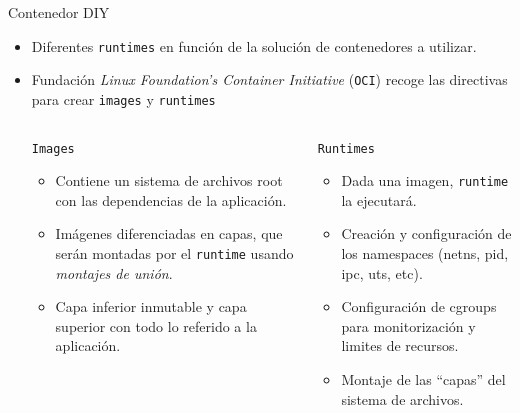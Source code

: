 \documentclass[aspectratio=169,xcolor=dvipsnames]{beamer}
\begin{document}
	\begin{frame}{Contenedor DIY}
	    \begin{itemize}
	        \item Diferentes \texttt{runtimes} en función de la solución de contenedores a utilizar.
	        \item Fundación \textit{Linux Foundation's Container Initiative} (\texttt{OCI}) recoge las directivas para crear \texttt{images} y \texttt{runtimes}
	        
	        \begin{columns}
	                \begin{column}{0.5\textwidth}
	                \begin{exampleblock}{\texttt{Images}}
	                    \begin{itemize}
	                        \item Contiene un sistema de archivos root con las dependencias de la aplicación.
	                        \item Imágenes diferenciadas en capas, que serán montadas por el \texttt{runtime} usando \textit{montajes de unión}.
	                        \item Capa inferior inmutable y capa superior con todo lo referido a la aplicación.
	                    \end{itemize}
	                \end{exampleblock}
	                \end{column}
	                
	                \begin{column}{0.5\textwidth}
	                \begin{exampleblock}{\texttt{Runtimes}}
	                    \begin{itemize}
	                        \item Dada una imagen, \texttt{runtime} la ejecutará.
	                        \item Creación y configuración de los namespaces (netns, pid, ipc, uts, etc).
	                        \item Configuración de cgroups para monitorización y limites de recursos.
	                        \item Montaje de las ``capas'' del sistema de archivos.
	                    \end{itemize}
	                \end{exampleblock}    
	                \end{column}
	        \end{columns}
	    \end{itemize}
	\end{frame}
	
\end{document}
